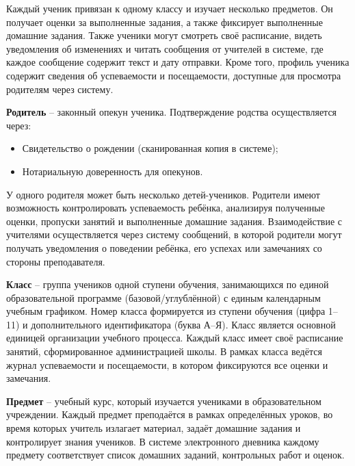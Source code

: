 \documentclass[a4paper, final]{article}
\begin{document}
Каждый ученик привязан к одному классу и изучает несколько предметов. Он получает оценки за выполненные задания, а также фиксирует выполненные домашние задания. Также ученики могут смотреть своё расписание, видеть уведомления об изменениях и читать сообщения от учителей в системе, где каждое сообщение содержит текст и дату отправки. Кроме того, профиль ученика содержит сведения об успеваемости и посещаемости, доступные для просмотра родителям через систему.

\textbf{Родитель} -- законный опекун ученика. Подтверждение родства осуществляется через:
\begin{itemize}
  \item Свидетельство о рождении (сканированная копия в системе);
  \item Нотариальную доверенность для опекунов.
\end{itemize}

У одного родителя может быть несколько детей-учеников. Родители имеют возможность контролировать успеваемость ребёнка, анализируя полученные оценки, пропуски занятий и выполненные домашние задания. Взаимодействие с учителями осуществляется через систему сообщений, в которой родители могут получать уведомления о поведении ребёнка, его успехах или замечаниях со стороны преподавателя.

\textbf{Класс} -- группа учеников одной ступени обучения, занимающихся по единой образовательной программе (базовой/углублённой) с единым календарным учебным графиком. Номер класса формируется из ступени обучения (цифра 1--11) и дополнительного идентификатора (буква А--Я). Класс является основной единицей организации учебного процесса. Каждый класс имеет своё расписание занятий, сформированное администрацией школы. В рамках класса ведётся журнал успеваемости и посещаемости, в котором фиксируются все оценки и замечания.

\textbf{Предмет} -- учебный курс, который изучается учениками в образовательном учреждении. Каждый предмет преподаётся в рамках определённых уроков, во время которых учитель излагает материал, задаёт домашние задания и контролирует знания учеников. В системе электронного дневника каждому предмету соответствует список домашних заданий, контрольных работ и оценок.
\end{document}
